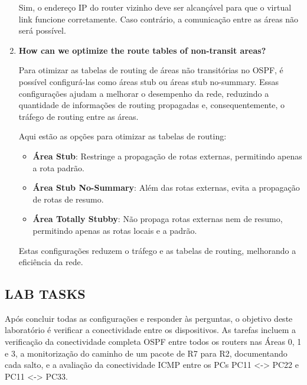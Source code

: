 \documentclass[11pt,english, openright, oneside]{book}
\begin{document}
\begin{enumerate}
  \par Sim, o endereço IP do router vizinho deve ser alcançável para que o virtual link funcione corretamente. Caso contrário, a comunicação entre as áreas não será possível.
  \vspace{0.2cm}

  \item \textbf{How can we optimize the route tables of non-transit areas?}
  \vspace{0.2cm}

  \par Para otimizar as tabelas de routing de áreas não transitórias no OSPF, é possível configurá-las como áreas stub ou áreas stub no-summary. Essas configurações ajudam a melhorar o desempenho da rede, reduzindo a quantidade de informações de routing propagadas e, consequentemente, o tráfego de routing entre as áreas.

  \par Aqui estão as opções para otimizar as tabelas de routing:
  \vspace{0.2cm}

  \begin{itemize}
    \item \textbf{Área Stub}: Restringe a propagação de rotas externas, permitindo apenas a rota padrão.
    \item \textbf{Área Stub No-Summary}: Além das rotas externas, evita a propagação de rotas de resumo.
    \item \textbf{Área Totally Stubby}: Não propaga rotas externas nem de resumo, permitindo apenas as rotas locais e a padrão.
  \end{itemize}
  \vspace{0.2cm}

  \par Estas configurações reduzem o tráfego e as tabelas de routing, melhorando a eficiência da rede.
  \vspace{0.2cm}
  \end{enumerate}

\subsection{LAB TASKS}
\vspace{0.2cm}

\par Após concluir todas as configurações e responder às perguntas, o objetivo deste laboratório é verificar a conectividade entre os dispositivos. As tarefas incluem a verificação da conectividade completa OSPF entre todos os routers nas Áreas 0, 1 e 3, a monitorização do caminho de um pacote de R7 para R2, documentando cada salto, e a avaliação da conectividade ICMP entre os PCs PC11 <-> PC22 e PC11 <-> PC33.
\end{document}
